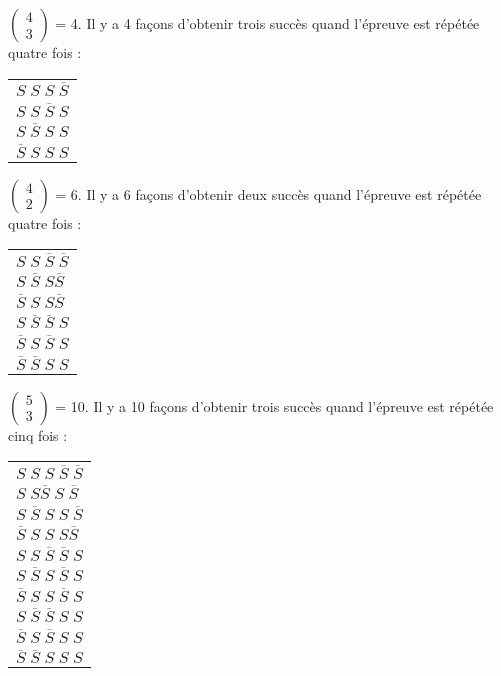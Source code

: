 $\left(\begin{array}{c} 4 \\ 3 \end{array} \right)$ = 4. Il y a 4 façons d'obtenir trois succès quand l'épreuve est répétée quatre fois : \\

\begin{tabular}{l}
$ S \; S \; S \; \overline{S} $ \\
$ S \; S  \; \overline{S} \; S $ \\
$ S \; \overline{S} \; S \; S $ \\
$ \overline{S} \; S \; S \; S $ \\
\end{tabular}

\vspace{.3cm}

$\left(\begin{array}{c} 4 \\ 2 \end{array} \right)$ = 6. Il y a 6 façons d'obtenir deux succès quand l'épreuve est répétée quatre fois : \\

\begin{tabular}{l}
$ S \; S \; \overline{S} \; \overline{S} $ \\
$ S \; \overline{S} \; S \overline{S} $ \\
$ \overline{S} \; S \; S \overline{S} $ \\
$ S \; \overline{S}  \; \overline{S} \; S $ \\
$ \overline{S} \; S \; \overline{S} \; S $ \\
$ \overline{S} \; \overline{S} \; S \; S $ \\
\end{tabular}

\vspace{.3cm}

$\left(\begin{array}{c} 5 \\ 3 \end{array} \right)$ = 10. Il y a 10 façons d'obtenir trois succès quand l'épreuve est répétée cinq fois : \\

\begin{tabular}{l}
$ S \; S \; S\; \overline{S} \; \overline{S} $ \\
$ S \; S \overline{S} \; S \; \overline{S} $ \\
$ S \; \overline{S} \; S \; S \; \overline{S} $ \\
$ \overline{S}  \; S \; S \; S \overline{S} $ \\
$ S \; S \;  \overline{S} \; \overline{S} \; S $ \\
$ S \; \overline{S} \; S \; \overline{S} \; S $ \\
$ \overline{S} \; S \; S \; \overline{S} \; S $ \\
$ S \; \overline{S} \; \overline{S} \; S \; S $ \\
$  \overline{S} \; S \; \overline{S} \; S \; S $ \\
$  \overline{S} \; \overline{S} \; S \; S \; S $ \\
\end{tabular}

